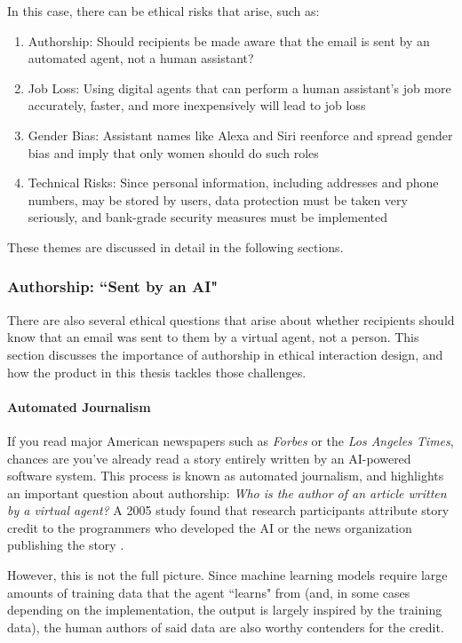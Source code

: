 \documentclass{article}
\begin{document}
In this case, there can be ethical risks that arise, such as:

\begin{enumerate}
 \item Authorship: Should recipients be made aware that the email is sent by an automated agent, not a human assistant?
 \item Job Loss: Using digital agents that can perform a human assistant's job more accurately, faster, and more inexpensively will lead to job loss
 \item Gender Bias: Assistant names like Alexa and Siri reenforce and spread gender bias and imply that only women should do such roles
 \item Technical Risks: Since personal information, including addresses and phone numbers, may be stored by users, data protection must be taken very seriously, and bank-grade security measures must be implemented
\end{enumerate}

These themes are discussed in detail in the following sections.

\subsubsection{Authorship: ``Sent by an AI"}

There are also several ethical questions that arise about whether recipients should know that an email was sent to them by a virtual agent, not a person. This section discusses the importance of authorship in ethical interaction design, and how the product in this thesis tackles those challenges.

\paragraph{Automated Journalism}


If you read major American newspapers such as \emph{Forbes} or the \emph{Los Angeles Times}, chances are you've already read a story entirely written by an AI-powered software system. This process is known as automated journalism, and highlights an important question about authorship: \emph{Who is the author of an article written by a virtual agent?} A 2005 study found that research participants attribute story credit to the programmers who developed the AI or the news organization publishing the story \cite{montal_i_2017}.

However, this is not the full picture. Since machine learning models require large amounts of training data that the agent ``learns" from (and, in some cases depending on the implementation, the output is largely inspired by the training data), the human authors of said data are also worthy contenders for the credit.
\end{document}
